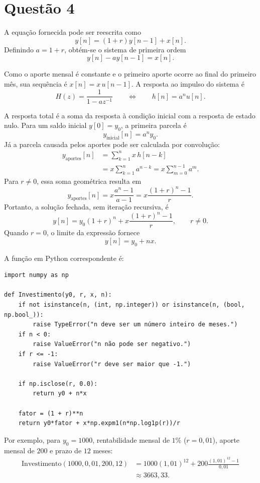 \documentclass[12pt]{article}
\begin{document}
\section*{Questão 4}

A equação fornecida pode ser reescrita como
\[
y[n]=(1+r)y[n-1]+x[n].
\]
Definindo $a=1+r$, obtém-se o sistema de primeira ordem
\[
y[n]-ay[n-1]=x[n].
\]

Como o aporte mensal é constante e o primeiro aporte ocorre ao final do primeiro
mês, sua sequência é $x[n]=x\,u[n-1]$. A resposta ao impulso do sistema é
\[
H(z)=\frac{1}{1-az^{-1}}
\qquad\Longleftrightarrow\qquad
h[n]=a^n u[n].
\]

A resposta total é a soma da resposta à condição inicial com a resposta de estado
nulo. Para um saldo inicial $y[0]=y_0$, a primeira parcela é
\[
y_{\mathrm{inicial}}[n]=a^n y_0.
\]
Já a parcela causada pelos aportes pode ser calculada por convolução:
\[
\begin{aligned}
y_{\mathrm{aportes}}[n]
  &=\sum_{k=1}^{n}x\,h[n-k] \\
  &=x\sum_{k=1}^{n}a^{n-k}
   =x\sum_{m=0}^{n-1}a^m.
\end{aligned}
\]
Para $r\neq 0$, essa soma geométrica resulta em
\[
y_{\mathrm{aportes}}[n]
=x\frac{a^n-1}{a-1}
=x\frac{(1+r)^n-1}{r}.
\]
Portanto, a solução fechada, sem iteração recursiva, é
\[
\boxed{
y[n]=y_0(1+r)^n+x\frac{(1+r)^n-1}{r}
},\qquad r\neq 0.
\]
Quando $r=0$, o limite da expressão fornece
\[
\boxed{y[n]=y_0+nx}.
\]

\noindent A função em Python correspondente é:
\begin{verbatim}
import numpy as np

def Investimento(y0, r, x, n):
    if not isinstance(n, (int, np.integer)) or isinstance(n, (bool, np.bool_)):
        raise TypeError("n deve ser um número inteiro de meses.")
    if n < 0:
        raise ValueError("n não pode ser negativo.")
    if r <= -1:
        raise ValueError("r deve ser maior que -1.")

    if np.isclose(r, 0.0):
        return y0 + n*x

    fator = (1 + r)**n
    return y0*fator + x*np.expm1(n*np.log1p(r))/r
\end{verbatim}

Por exemplo, para $y_0=1000$, rentabilidade mensal de $1\%$
($r=0{,}01$), aporte mensal de $200$ e prazo de $12$ meses:
\[
\begin{aligned}
\mathrm{Investimento}(1000,0{,}01,200,12)
&=1000(1{,}01)^{12}
  +200\frac{(1{,}01)^{12}-1}{0{,}01}\\
&\approx 3663{,}33.
\end{aligned}
\]
\end{document}
